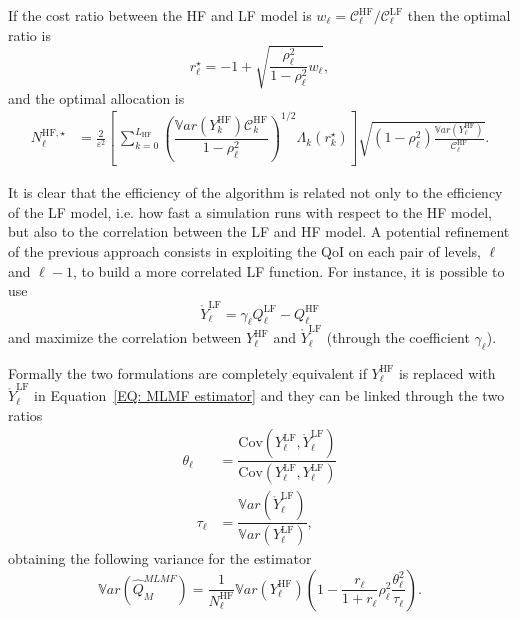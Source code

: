 If the cost ratio between the HF and LF model is $w_{\ell} =  \mathcal{C}_{\ell}^{\mathrm{HF}} / \mathcal{C}_{\ell}^{\mathrm{LF}}$ then the optimal ratio
is 
\begin{equation}
 r_\ell^{\star} = -1 + \sqrt{ \dfrac{\rho_\ell^2}{1-\rho_\ell^2} w_{\ell}},
\end{equation}
and
the optimal allocation is
\begin{equation}
 \begin{split}
  N_{\ell}^{\mathrm{HF},\star} &= \frac{2}{\varepsilon^2} \!\! \left[ \, \sum_{k=0}^{L_{\mathrm{HF}}} 
        \left( \dfrac{ \mathbb{V}ar\left(  Y_k^{ \mathrm{HF} } \right) \mathcal{C}_{k}^{\mathrm{HF}}}{1-\rho_\ell^2} \right)^{1/2} \Lambda_{k}(r_k^{\star}) \right] 
               \sqrt{ \left( 1 - \rho_\ell^2 \right) \frac{ \mathbb{V}ar\left(Y^{\mathrm{HF}}_{\ell}\right) }{\mathcal{C}_{\ell}^{\mathrm{HF}}}}.
\end{split}
\end{equation}
               
               
It is clear that the efficiency of the algorithm is related not only to the efficiency of the LF model, i.e. how fast a simulation runs with respect
to the HF model, but also to the correlation between the LF and HF model.
A potential refinement of the previous approach consists in exploiting the QoI on each pair of levels, $\ell$ and $\ell-1$, to 
build a more correlated LF function. For instance, it is possible to use
\begin{equation}
 \mathring{Y}^{\mathrm{LF}}_{\ell} =  \gamma_\ell Q_\ell^{\mathrm{LF}} - Q_\ell^{\mathrm{HF}}
\end{equation}
and maximize the correlation between $Y_\ell^{\mathrm{HF}}$ and $\mathring{Y}^{\mathrm{LF}}_{\ell}$ (through the coefficient $\gamma_\ell$).

Formally the two formulations are completely equivalent if $Y_\ell^{\mathrm{HF}}$ is replaced with $\mathring{Y}^{\mathrm{LF}}_{\ell}$ in 
Equation~\eqref{EQ: MLMF estimator} and they can be linked through the two ratios
  \begin{equation}
 \begin{split}
 \theta_{\ell} &= \dfrac{  \mathrm{Cov}\left(  Y^{\mathrm{LF}}_{\ell},\mathring{Y}^{\mathrm{LF}}_{\ell} \right)   }
                        {  \mathrm{Cov}\left( Y^{\mathrm{LF}}_{\ell},Y^{\mathrm{LF}}_{\ell} \right)  } \\
 \quad \tau_{\ell}  &= \dfrac{  \mathbb{V}ar\left(  \mathring{Y}^{\mathrm{LF}}_{\ell} \right)  }{ \mathbb{V}ar\left( Y^{\mathrm{LF}}_{\ell} \right) },
 \end{split}
\end{equation}
obtaining the following variance for the estimator
\begin{equation}
 \mathbb{V}ar\left(\hat{Q}_M^{MLMF} \right) = \dfrac{1}{N_{\ell}^{\mathrm{HF}}} \mathbb{V}ar\left( Y^{\mathrm{HF}}_{\ell} \right) 
 \left( 1 - \dfrac{r_\ell}{1+r_\ell} \rho_\ell^2 \dfrac{\theta_\ell^2}{\tau_\ell} \right).
\end{equation}

